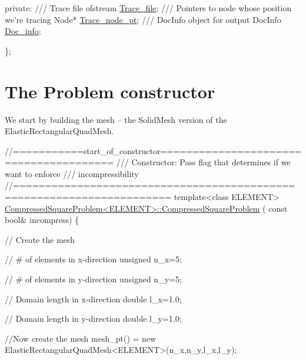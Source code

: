 \begin{DoxyCodeInclude}
\textcolor{keyword}{private}:
\textcolor{comment}{}
\textcolor{comment}{ /// Trace file}
\textcolor{comment}{} ofstream \hyperlink{classCompressedSquareProblem_afc8bc8ff7811d18f8d59cd1c35e6cb00}{Trace\_file};
 \textcolor{comment}{}
\textcolor{comment}{ /// Pointers to node whose position we're tracing}
\textcolor{comment}{} Node* \hyperlink{classCompressedSquareProblem_a0af6b1044a8392a3ae3d753f4db52664}{Trace\_node\_pt};
\textcolor{comment}{}
\textcolor{comment}{ /// DocInfo object for output}
\textcolor{comment}{} DocInfo \hyperlink{classCompressedSquareProblem_a2269691c7bef351c87a4421d275fe7c3}{Doc\_info};
 
\};

\end{DoxyCodeInclude}




 

\hypertarget{index_constructor}{}\section{The Problem constructor}\label{index_constructor}
We start by building the mesh -- the {\ttfamily Solid\+Mesh} version of the {\ttfamily Elastic\+Rectangular\+Quad\+Mesh}.


\begin{DoxyCodeInclude}
\textcolor{comment}{//===========start\_of\_constructor======================================= }
\textcolor{comment}{/// Constructor: Pass flag that determines if we want to enforce}
\textcolor{comment}{}\textcolor{comment}{/// incompressibility}
\textcolor{comment}{}\textcolor{comment}{//====================================================================== }
\textcolor{keyword}{template}<\textcolor{keyword}{class} ELEMENT>
\hyperlink{classCompressedSquareProblem_af013df43f2a9f6ee8ff16cf59ddd9439}{CompressedSquareProblem<ELEMENT>::CompressedSquareProblem}
      (
 \textcolor{keyword}{const} \textcolor{keywordtype}{bool}& incompress)
\{

 \textcolor{comment}{// Create the mesh}

 \textcolor{comment}{// # of elements in x-direction}
 \textcolor{keywordtype}{unsigned} n\_x=5;

 \textcolor{comment}{// # of elements in y-direction}
 \textcolor{keywordtype}{unsigned} n\_y=5;

 \textcolor{comment}{// Domain length in x-direction}
 \textcolor{keywordtype}{double} l\_x=1.0;

 \textcolor{comment}{// Domain length in y-direction}
 \textcolor{keywordtype}{double} l\_y=1.0;
 
 \textcolor{comment}{//Now create the mesh }
 mesh\_pt() = \textcolor{keyword}{new} ElasticRectangularQuadMesh<ELEMENT>(n\_x,n\_y,l\_x,l\_y);

\end{DoxyCodeInclude}


